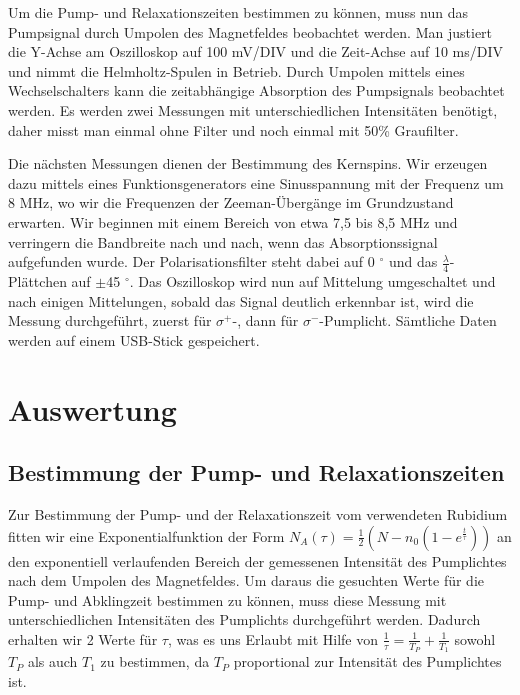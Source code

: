 \documentclass[bigchapter,colorback,accentcolor=tud4b,linedtoc,11pt]{tudreport}
\begin{document}
Um die Pump- und Relaxationszeiten bestimmen zu können, muss nun das Pumpsignal durch Umpolen des Magnetfeldes beobachtet werden. Man justiert die Y-Achse am Oszilloskop auf 100 mV/DIV und die Zeit-Achse auf 10 ms/DIV und nimmt die Helmholtz-Spulen in Betrieb. Durch Umpolen mittels eines Wechselschalters kann die zeitabhängige Absorption des Pumpsignals beobachtet werden. Es werden zwei Messungen mit unterschiedlichen Intensitäten benötigt, daher misst man einmal ohne Filter und noch einmal mit 50\% Graufilter. 

Die nächsten Messungen dienen der Bestimmung des Kernspins. Wir erzeugen dazu mittels eines Funktionsgenerators eine Sinusspannung mit der Frequenz um 8 MHz, wo wir die Frequenzen der Zeeman-Übergänge im Grundzustand erwarten. Wir beginnen mit einem Bereich von etwa 7,5 bis 8,5 MHz und verringern die Bandbreite nach und nach, wenn das Absorptionssignal aufgefunden wurde. Der Polarisationsfilter steht dabei auf 0 $^{\circ}$ und das $\frac{\lambda}{4}$-Plättchen auf $\pm$45 $^{\circ}$. Das Oszilloskop wird nun auf Mittelung umgeschaltet und nach einigen Mittelungen, sobald das Signal deutlich erkennbar ist, wird die Messung durchgeführt, zuerst für $\sigma^+$-, dann für $\sigma^-$-Pumplicht. Sämtliche Daten werden auf einem USB-Stick gespeichert.

\chapter{Auswertung}
\section{Bestimmung der Pump- und Relaxationszeiten}
Zur Bestimmung der Pump- und der Relaxationszeit vom verwendeten Rubidium fitten
wir eine Exponentialfunktion der Form  $N_A(\tau) = \frac{1}{2} (N-n_0
(1-e^{\frac{t}{\tau}}))$ an den exponentiell verlaufenden Bereich der gemessenen
Intensität des Pumplichtes nach dem Umpolen des Magnetfeldes. Um daraus die
gesuchten Werte für die Pump- und Abklingzeit bestimmen zu können, muss diese
Messung mit unterschiedlichen Intensitäten des Pumplichts durchgeführt
werden. Dadurch erhalten wir 2 Werte für $\tau$, was es uns Erlaubt mit Hilfe
von $\frac{1}{\tau} = \frac{1}{T_P} + \frac{1}{T_1}$ sowohl $T_P$ als auch $T_1$
zu bestimmen, da $T_P$ proportional zur Intensität des Pumplichtes ist.
\end{document}
